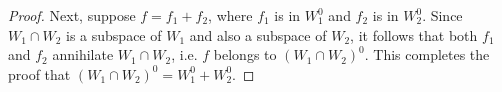 \begin{enumerate}
\begin{proof}
    Next, suppose $f = f_1 + f_2$, where $f_1$ is in $W_1^0$ and $f_2$
    is in $W_2^0$. Since $W_1\cap W_2$ is a subspace of $W_1$ and also
    a subspace of $W_2$, it follows that both $f_1$ and $f_2$
    annihilate $W_1\cap W_2$, i.e. $f$ belongs to $(W_1\cap
    W_2)^0$. This completes the proof that
    $(W_1\cap W_2)^0 = W_1^0 + W_2^0$.
  \end{proof}
\end{enumerate}
